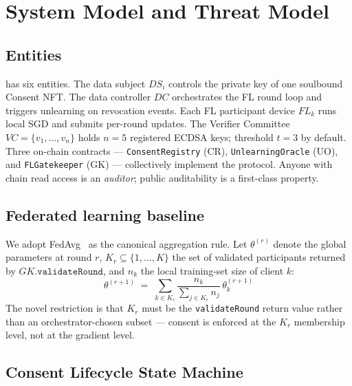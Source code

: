 \section{System Model and Threat Model}
\label{sec:system-model}

\subsection{Entities}

\sysname has six entities. The data subject $\mathit{DS}_i$ controls
the private key of one soulbound Consent NFT. The data controller
$\mathit{DC}$ orchestrates the FL round loop and triggers unlearning
on revocation events. Each FL participant device $\mathit{FL}_k$ runs
local SGD and submits per-round updates. The Verifier Committee
$\mathit{VC} = \{v_1, \ldots, v_n\}$ holds $n=5$ registered ECDSA
keys; threshold $t=3$ by default. Three on-chain contracts
--- \texttt{ConsentRegistry} (CR), \texttt{UnlearningOracle} (UO), and
\texttt{FLGatekeeper} (GK) --- collectively implement the protocol.
Anyone with chain read access is an \emph{auditor}; public
auditability is a first-class property.

\subsection{Federated learning baseline}

We adopt FedAvg~\cite{mcmahan2017fedavg} as the canonical aggregation
rule. Let $\theta^{(r)}$ denote the global parameters at round $r$,
$K_r \subseteq \{1,\ldots,K\}$ the set of validated participants
returned by $\mathit{GK}.\mathtt{validateRound}$, and $n_k$ the local
training-set size of client $k$:
\begin{equation}\label{eq:fedavg}
    \theta^{(r+1)} \;=\; \sum_{k \in K_r}
        \frac{n_k}{\sum_{j \in K_r} n_j} \,\theta^{(r+1)}_k
\end{equation}
The novel restriction is that $K_r$ must be the
\texttt{validateRound} return value rather than an
orchestrator-chosen subset --- consent is enforced at the
$K_r$ membership level, not at the gradient level.

\subsection{Consent Lifecycle State Machine}
\label{sec:clsm-formal}

